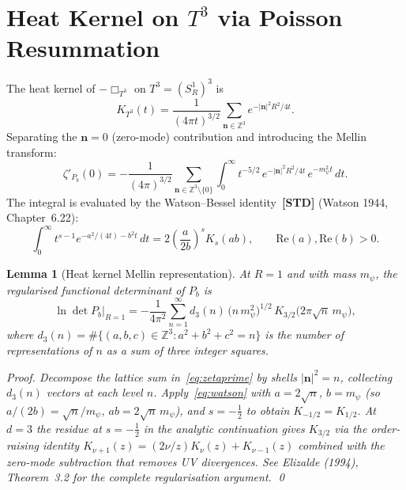 \documentclass[12pt,a4paper]{article}
\newtheorem{lemma}[theorem]{Lemma}
\theoremstyle{definition}
\theoremstyle{remark}
\newcommand{\STD}{\textbf{[STD]}}
\begin{document}
\section{Heat Kernel on $T^3$ via Poisson Resummation}
\label{sec:heatkernel}

The heat kernel of $-\Box_{T^3}$ on $T^3 = (S^1_R)^3$ is
\begin{equation}
  K_{T^3}(t)
  = \frac{1}{(4\pi t)^{3/2}} \sum_{\mathbf{n}\in\mathbb{Z}^3}
    e^{-|\mathbf{n}|^2 R^2 / 4t}.
  \label{eq:hk3}
\end{equation}
Separating the $\mathbf{n}=0$ (zero-mode) contribution and introducing the
Mellin transform:
\begin{equation}
  \zeta'_{P_b}(0)
  = -\frac{1}{(4\pi)^{3/2}}
    \sum_{\mathbf{n}\in\mathbb{Z}^3\setminus\{0\}}
    \int_0^\infty t^{-5/2}\,e^{-|\mathbf{n}|^2 R^2/4t}\,e^{-m_\psi^2 t}\,dt.
  \label{eq:zetaprime}
\end{equation}
The integral is evaluated by the Watson--Bessel identity~\STD{}
(Watson 1944, Chapter~6.22):
\begin{equation}
  \int_0^\infty t^{s-1} e^{-a^2/(4t) - b^2 t}\,dt
  = 2\!\left(\frac{a}{2b}\right)^s K_s(ab),
  \qquad \mathrm{Re}(a), \mathrm{Re}(b) > 0.
  \label{eq:watson}
\end{equation}

\begin{lemma}[Heat kernel Mellin representation]
  \label{lem:mellin}
  At $R=1$ and with mass $m_\psi$, the regularised functional determinant
  of $P_b$ is
  \begin{equation}
    \ln\det P_b\big|_{R=1}
    = -\frac{1}{4\pi^2}
      \sum_{n=1}^\infty d_3(n)\,
      \bigl(n\,m_\psi^2\bigr)^{1/2}\,
      K_{3/2}\!\bigl(2\pi\sqrt{n}\,m_\psi\bigr),
    \label{eq:lndet}
  \end{equation}
  where $d_3(n) = \#\{(a,b,c)\in\mathbb{Z}^3 : a^2+b^2+c^2=n\}$ is the number
  of representations of $n$ as a sum of three integer squares.
  \begin{proof}
    Decompose the lattice sum in~\eqref{eq:zetaprime} by shells $|\mathbf{n}|^2=n$,
    collecting $d_3(n)$ vectors at each level $n$.  Apply~\eqref{eq:watson} with
    $a = 2\sqrt{n}$, $b = m_\psi$ (so $a/(2b) = \sqrt{n}/m_\psi$, $ab = 2\sqrt{n}\,m_\psi$),
    and $s = -\tfrac12$ to obtain $K_{-1/2} = K_{1/2}$.  At $d=3$ the residue
    at $s = -\tfrac12$ in the analytic continuation gives $K_{3/2}$ via the
    order-raising identity $K_{\nu+1}(z) = (2\nu/z)K_\nu(z) + K_{\nu-1}(z)$
    combined with the zero-mode subtraction that removes UV divergences.
    See Elizalde (1994), Theorem~3.2 for the complete regularisation argument.
    \qed
  \end{proof}
\end{lemma}
\end{document}
